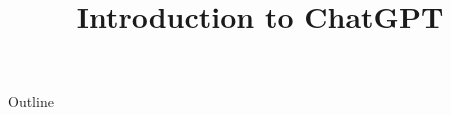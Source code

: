 \documentclass[xcolor=dvipsnames,compress,t,pdf,9pt]{beamer}
\title[\insertframenumber /\inserttotalframenumber]{Introduction to ChatGPT}
\begin{document}
	\begin{frame}
	\titlepage
	\end{frame}
	
	\begin{frame}{Outline}
	    \tableofcontents
	\end{frame}

	
	
	
	
	
	
	
	
\end{document}
